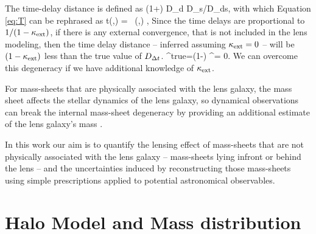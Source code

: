 \documentclass[useAMS,usenatbib]{mn2e}
\begin{document}

The time-delay distance is defined as
\be \label{eq:dt}
\Dt \equiv (1+\zd) D_{\rm d} D_{\rm s}/D_{\rm ds},
\ee
with which Equation \ref{eq:T} can be rephrased as
\be
\Delta t(\bmath{\theta},\bmath{\beta})  =   \, \phi(\bmath{\theta},\bmath{\beta})    ,
\ee 
Since the time delays are proportional to $1/ (1- \kappa_{\rm ext})$, if there is any external convergence, that is not included in the lens
modeling, then the time delay distance -- inferred assuming $\kappa_{\rm ext} = 0$ -- will be
$(1-\kappa_{\rm ext})$ less than the true value of $D_{\Delta t}$.
\be 
\label{eq:MassSheet:H0bias}
\Dt^{\rm{true}}=(1-\kappax) \Dt^{{\kappax = 0}}.
\ee
We can overcome this degeneracy if we have additional knowledge of $\kappa_{\rm ext}$.

For mass-sheets that are physically associated with the lens galaxy, the mass sheet
 affects the stellar dynamics of the
lens galaxy, so dynamical observations can break the internal
mass-sheet degeneracy by providing an additional estimate of the lens galaxy's mass
\citep[e.g.,][]{xxx}. 

In this work our aim is to quantify the lensing effect of mass-sheets that are not physically associated with the lens galaxy -- mass-sheets
lying infront or behind the lens -- and the uncertainties induced by reconstructing
those mass-sheets using simple prescriptions applied to potential astronomical observables.



\section{Halo Model and Mass distribution}
\label{sec:model}

%
\end{document}

